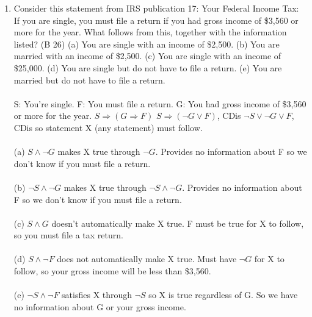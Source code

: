 \documentclass[]{article}
\begin{document}
\begin{enumerate}
    \item Consider this statement from IRS publication 17: Your Federal Income Tax: If you are single, you must file a return if you had gross income of \$3,560 or more for the year. What follows from this, together with the information listed? (B 26)
    \newline(a) You are single with an income of \$2,500.
    \newline(b) You are married with an income of \$2,500.
    \newline(c) You are single with an income of \$25,000.
    \newline(d) You are single but do not have to file a return.
    \newline(e) You are married but do not have to file a return.
    \\\\S: You're single.
    \newline F: You must file a return.
    \newline G: You had gross income of \$3,560 or more for the year.
    \newline $S \Rightarrow (G\Rightarrow F)$
    \newline $S \Rightarrow (\neg G \lor F)$, CDis
    \newline $\neg S \lor \neg G \lor F$, CDis so statement X (any statement) must follow.
    \\\\(a) $S \land \neg G$ makes X true through $\neg G$. Provides no information about F so we don't know if you must file a return.
    \\\\(b) $\neg S \land \neg G$ makes X true through $\neg S \land \neg G$. Provides no information about F so we don't know if you must file a return.
    \\\\(c) $S \land G$ doesn't automatically make X true. F must be true for X to follow, so you must file a tax return.
    \\\\(d) $S \land \neg F$ does not automatically make X true. Must have $\neg G$ for X to follow, so your gross income will be less than \$3,560.
    \\\\(e) $\neg S \land \neg F$ satisfies X through $\neg S$ so X is true regardless of G. So we have no information about G or your gross income.
    

\end{enumerate}
\end{document}
